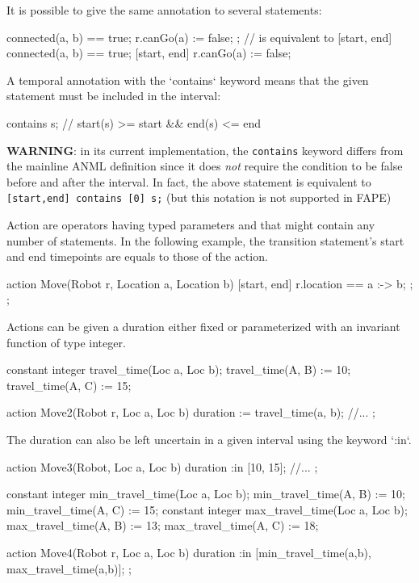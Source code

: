 It is possible to give the same annotation to several statements:
\begin{anmlcode}
 {
  connected(a, b) == true;
  r.canGo(a) := false;
};
// is equivalent to
[start, end] connected(a, b) == true;
[start, end] r.canGo(a) := false;
\end{anmlcode}


A temporal annotation with the `contains` keyword means that the given
statement must be included in the interval:
\begin{anmlcode}
 contains s;
// start(s) >= start && end(s) <= end
\end{anmlcode}
  
{\bf WARNING}: in its current implementation, the \lstinline!contains! keyword differs from the mainline ANML definition since it does \emph{not} require the condition to be false before and after the interval.
In fact, the above statement is equivalent to \lstinline![start,end] contains [0] s;! (but this notation is not supported in FAPE)



Action are operators having typed parameters and that might contain any number
of statements. In the following example, the transition statement's start and
end timepoints are equals to those of the action.
\begin{anmlcode}
action Move(Robot r, Location a, Location b) {
  [start, end] {
    r.location == a :-> b;
  };
};
\end{anmlcode}


Actions can be given a duration either fixed or parameterized with an invariant function of type integer.
\begin{anmlcode}
constant integer travel_time(Loc a, Loc b);
travel_time(A, B) := 10;
travel_time(A, C) := 15;

action Move2(Robot r, Loc a, Loc b) {
  duration := travel_time(a, b);
  //...
};
\end{anmlcode}
    
The duration can also be left uncertain in a given interval using the keyword `:in`.

\begin{anmlcode}
action Move3(Robot, Loc a, Loc b) {
  duration :in [10, 15];
  //...
};

constant integer min_travel_time(Loc a, Loc b);
min_travel_time(A, B) := 10;
min_travel_time(A, C) := 15;
constant integer max_travel_time(Loc a, Loc b);
max_travel_time(A, B) := 13;
max_travel_time(A, C) := 18;

action Move4(Robot r, Loc a, Loc b) {
  duration :in [min_travel_time(a,b), max_travel_time(a,b)];
};
\end{anmlcode}

